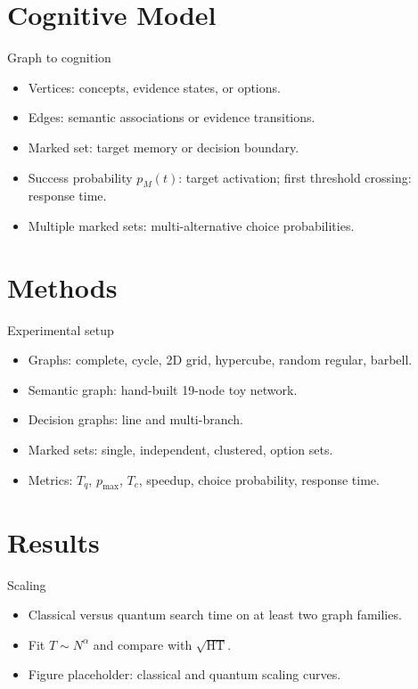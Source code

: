 \documentclass[aspectratio=169,11pt]{beamer}
\newcommand{\HT}{\mathrm{HT}}
\begin{document}
\section{Cognitive Model}

\begin{frame}{Graph to cognition}
  \begin{itemize}
    \item Vertices: concepts, evidence states, or options.
    \item Edges: semantic associations or evidence transitions.
    \item Marked set: target memory or decision boundary.
    \item Success probability $p_M(t)$: target activation; first threshold crossing: response time.
    \item Multiple marked sets: multi-alternative choice probabilities.
  \end{itemize}
\end{frame}

\section{Methods}

\begin{frame}{Experimental setup}
  \begin{itemize}
    \item Graphs: complete, cycle, 2D grid, hypercube, random regular, barbell.
    \item Semantic graph: hand-built 19-node toy network.
    \item Decision graphs: line and multi-branch.
    \item Marked sets: single, independent, clustered, option sets.
    \item Metrics: $T_q$, $p_{\max}$, $T_c$, speedup, choice probability, response time.
  \end{itemize}
\end{frame}

\section{Results}

\begin{frame}{Scaling}
  \begin{itemize}
    \item Classical versus quantum search time on at least two graph families.
    \item Fit $T\sim N^\alpha$ and compare with $\sqrt{\HT}$.
    \item Figure placeholder: classical and quantum scaling curves.
  \end{itemize}
\end{frame}
\end{document}
